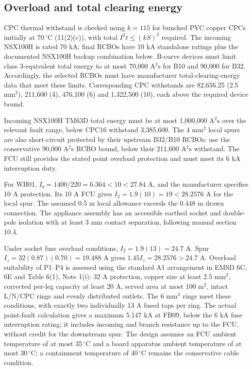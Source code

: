 \subsection*{Overload and total clearing energy}
CPC thermal withstand is checked using $k=115$ for bunched PVC copper CPCs initially at 70\,$^\circ$C (11(2)(c)), with total $I^2t\le(kS)^2$ required. The incoming NSX100H is rated 70 kA; final RCBOs have 10 kA standalone ratings plus the documented NSX100H backup combination below. B-curve devices must limit class 3-equivalent total energy to at most 70,000 A$^2$s for B10 and 90,000 for B32. Accordingly, the selected RCBOs must have manufacturer total-clearing-energy data that meet these limits. Corresponding CPC withstands are 82,656.25 (2.5 mm$^2$), 211,600 (4), 476,100 (6) and 1,322,500 (10), each above the required device bound.

Incoming NSX100H TM63D total energy must be at most 1,000,000 A$^2$s over the relevant fault range, below CPC16 withstand 3,385,600. The 4 mm$^2$ local spurs are also short-circuit protected by their upstream B32/B10 RCBOs: use the conservative 90,000 A$^2$s RCBO bound, below their 211,600 A$^2$s withstand. The FCU still provides the stated point overload protection and must meet its 6 kA interruption duty.

For WH01, $I_b=1400/220=6.364<10<27.84$ A, and the manufacturer specifies 10 A protection. Its 10 A FCU gives $I_2=1.9(10)=19<28.2576$ A for the local spur. The assumed 0.5 m local allowance exceeds the 0.448 m drawn connection. The appliance assembly has an accessible earthed socket and double-pole isolation with at least 3 mm contact separation, following manual section 10.4.

Under socket fuse overload conditions, $I_2=1.9(13)=24.7$ A. Spur $I_z=32(0.87)(0.70)=19.488$ A gives $1.45I_z=28.2576>24.7$ A. Overload suitability of P1--P4 is assessed using the standard A1 arrangement in EMSD 6C, 6E and Table 6(1), Note 1(i): 32 A protection, copper size at least 2.5 mm$^2$, corrected per-leg capacity at least 20 A, served area at most 100 m$^2$, intact L/N/CPC rings and evenly distributed outlets. The 6 mm$^2$ rings meet these conditions, with exactly two individually 13 A fused taps per ring. The actual point-fault calculation gives a maximum 5.147 kA at FB09, below the 6 kA fuse interruption rating; it includes incoming and branch resistance up to the FCU, without credit for the downstream spur. The design assumes an FCU ambient temperature of at most 35\,$^\circ$C and a board apparatus ambient temperature of at most 30\,$^\circ$C; a containment temperature of 40\,$^\circ$C remains the conservative cable condition.

\clearpage
\begingroup\small

